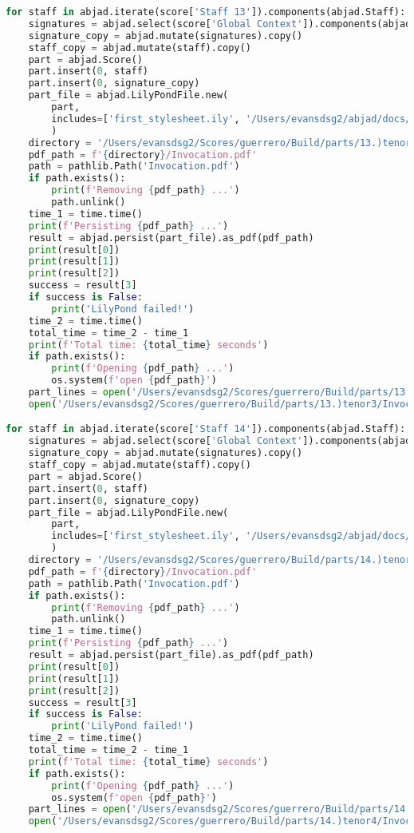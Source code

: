 \begin{lstlisting}[language=Python, caption=Invocation Source Code]
for staff in abjad.iterate(score['Staff 13']).components(abjad.Staff):
    signatures = abjad.select(score['Global Context']).components(abjad.Staff)
    signature_copy = abjad.mutate(signatures).copy()
    staff_copy = abjad.mutate(staff).copy()
    part = abjad.Score()
    part.insert(0, staff)
    part.insert(0, signature_copy)
    part_file = abjad.LilyPondFile.new(
        part,
        includes=['first_stylesheet.ily', '/Users/evansdsg2/abjad/docs/source/_stylesheets/abjad.ily'],
        )
    directory = '/Users/evansdsg2/Scores/guerrero/Build/parts/13.)tenor3'
    pdf_path = f'{directory}/Invocation.pdf'
    path = pathlib.Path('Invocation.pdf')
    if path.exists():
        print(f'Removing {pdf_path} ...')
        path.unlink()
    time_1 = time.time()
    print(f'Persisting {pdf_path} ...')
    result = abjad.persist(part_file).as_pdf(pdf_path)
    print(result[0])
    print(result[1])
    print(result[2])
    success = result[3]
    if success is False:
        print('LilyPond failed!')
    time_2 = time.time()
    total_time = time_2 - time_1
    print(f'Total time: {total_time} seconds')
    if path.exists():
        print(f'Opening {pdf_path} ...')
        os.system(f'open {pdf_path}')
    part_lines = open('/Users/evansdsg2/Scores/guerrero/Build/parts/13.)tenor3/Invocation.ly').readlines()
    open('/Users/evansdsg2/Scores/guerrero/Build/parts/13.)tenor3/Invocation.ly', 'w').writelines(part_lines[15:-1])

for staff in abjad.iterate(score['Staff 14']).components(abjad.Staff):
    signatures = abjad.select(score['Global Context']).components(abjad.Staff)
    signature_copy = abjad.mutate(signatures).copy()
    staff_copy = abjad.mutate(staff).copy()
    part = abjad.Score()
    part.insert(0, staff)
    part.insert(0, signature_copy)
    part_file = abjad.LilyPondFile.new(
        part,
        includes=['first_stylesheet.ily', '/Users/evansdsg2/abjad/docs/source/_stylesheets/abjad.ily'],
        )
    directory = '/Users/evansdsg2/Scores/guerrero/Build/parts/14.)tenor4'
    pdf_path = f'{directory}/Invocation.pdf'
    path = pathlib.Path('Invocation.pdf')
    if path.exists():
        print(f'Removing {pdf_path} ...')
        path.unlink()
    time_1 = time.time()
    print(f'Persisting {pdf_path} ...')
    result = abjad.persist(part_file).as_pdf(pdf_path)
    print(result[0])
    print(result[1])
    print(result[2])
    success = result[3]
    if success is False:
        print('LilyPond failed!')
    time_2 = time.time()
    total_time = time_2 - time_1
    print(f'Total time: {total_time} seconds')
    if path.exists():
        print(f'Opening {pdf_path} ...')
        os.system(f'open {pdf_path}')
    part_lines = open('/Users/evansdsg2/Scores/guerrero/Build/parts/14.)tenor4/Invocation.ly').readlines()
    open('/Users/evansdsg2/Scores/guerrero/Build/parts/14.)tenor4/Invocation.ly', 'w').writelines(part_lines[15:-1])


\end{lstlisting}
